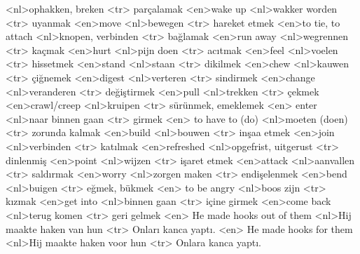 <nl>ophakken, breken
<tr> parçalamak
<en>wake up 
<nl>wakker worden
<tr> uyanmak
<en>move 
<nl>bewegen
<tr> hareket etmek
<en>to tie, to attach 
<nl>knopen, verbinden
<tr> bağlamak
<en>run away 
<nl>wegrennen
<tr> kaçmak
<en>hurt 
<nl>pijn doen
<tr> acıtmak
<en>feel 
<nl>voelen
<tr> hissetmek
<en>stand 
<nl>staan
<tr> dikilmek
<en>chew 
<nl>kauwen
<tr> çiğnemek
<en>digest 
<nl>verteren
<tr> sindirmek
<en>change 
<nl>veranderen
<tr> değiştirmek
<en>pull 
<nl>trekken
<tr> çekmek
<en>crawl/creep 
<nl>kruipen
<tr> sürünmek, emeklemek
<en> enter 
<nl>naar binnen gaan 
<tr> girmek 
<en> to have to (do) 
<nl>moeten (doen) 
<tr> zorunda kalmak
<en>build 
<nl>bouwen
<tr> inşaa etmek
<en>join 
<nl>verbinden
<tr> katılmak
<en>refreshed 
<nl>opgefrist, uitgerust
<tr> dinlenmiş
<en>point 
<nl>wijzen
<tr> işaret etmek
<en>attack 
<nl>aanvallen
<tr> saldırmak
<en>worry 
<nl>zorgen maken
<tr> endişelenmek
<en>bend 
<nl>buigen
<tr> eğmek, bükmek
<en> to be angry 
<nl>boos zijn
<tr> kızmak
<en>get into 
<nl>binnen gaan
<tr> içine girmek
<en>come back 
<nl>terug komen
<tr> geri gelmek
<en> He made hooks out of them 
<nl>Hij maakte haken van hun 
<tr> Onları kanca yaptı.
<en> He made hooks for them 
<nl>Hij maakte haken voor hun 
<tr> Onlara kanca yaptı.
